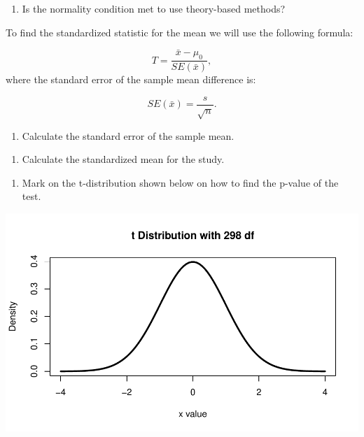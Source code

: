 \documentclass[
]{report}
\providecommand{\tightlist}{%
  \setlength{\itemsep}{0pt}\setlength{\parskip}{0pt}}
\begin{document}
\begin{enumerate}
\def\labelenumi{\arabic{enumi}.}
\setcounter{enumi}{9}
\tightlist
\item
  Is the normality condition met to use theory-based methods?
\end{enumerate}

\vspace{1in}

To find the standardized statistic for the mean we will use the following formula:

\[T = \frac{\bar{x} - \mu_0}{SE(\bar{x})},\]
where the standard error of the sample mean difference is:

\[SE(\bar{x})=\frac{s}{\sqrt{n}}.\]

\begin{enumerate}
\def\labelenumi{\arabic{enumi}.}
\setcounter{enumi}{10}
\tightlist
\item
  Calculate the standard error of the sample mean.
\end{enumerate}

\vspace{0.8in}

\begin{enumerate}
\def\labelenumi{\arabic{enumi}.}
\setcounter{enumi}{11}
\tightlist
\item
  Calculate the standardized mean for the study.
\end{enumerate}

\vspace{1in}

\begin{enumerate}
\def\labelenumi{\arabic{enumi}.}
\setcounter{enumi}{12}
\tightlist
\item
  Mark on the t-distribution shown below on how to find the p-value of the test.
\end{enumerate}

\begin{center}\includegraphics[width=0.7\linewidth]{10-UR-module6_review_files/figure-latex/tdistave-1} \end{center}
\end{document}
